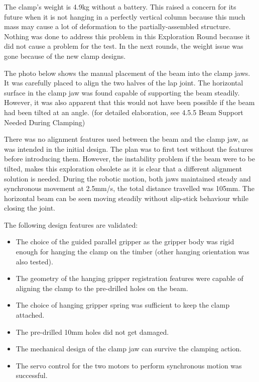 The clamp’s weight is 4.9kg without a battery. This raised a concern for its future when it is not hanging in a perfectly vertical column because this much mass may cause a lot of deformation to the partially-assembled structure. Nothing was done to address this problem in this Exploration Round because it did not cause a problem for the test. In the next rounds, the weight issue was gone because of the new clamp designs. 

The photo below shows the manual placement of the beam into the clamp jaws. It was carefully placed to align the two halves of the lap joint. The horizontal surface in the clamp jaw was found capable of supporting the beam steadily. However, it was also apparent that this would not have been possible if the beam had been tilted at an angle. (for detailed elaboration, see 4.5.5 Beam Support Needed During Clamping)

There was no alignment features used between the beam and the clamp jaw, as was intended in the initial design. The plan was to first test without the features before introducing them. However, the instability problem if the beam were to be tilted, makes this exploration obsolete as it is clear that a different alignment solution is needed.
During the robotic motion, both jaws maintained steady and synchronous movement at 2.5mm/s, the total distance travelled was 105mm. The horizontal beam can be seen moving steadily without slip-stick behaviour while closing the joint.  

The following design features are validated:
\begin{itemize}
    \item The choice of the guided parallel gripper as the gripper body was rigid enough for hanging the clamp on the timber (other hanging orientation was also tested).
    \item The geometry of the hanging gripper registration features were capable of aligning the clamp to the pre-drilled holes on the beam.
    \item The choice of hanging gripper spring was sufficient to keep the clamp attached.
    \item The pre-drilled 10mm holes did not get damaged.
    \item The mechanical design of the clamp jaw can survive the clamping action.
    \item The servo control for the two motors to perform synchronous motion was successful.
\end{itemize}

